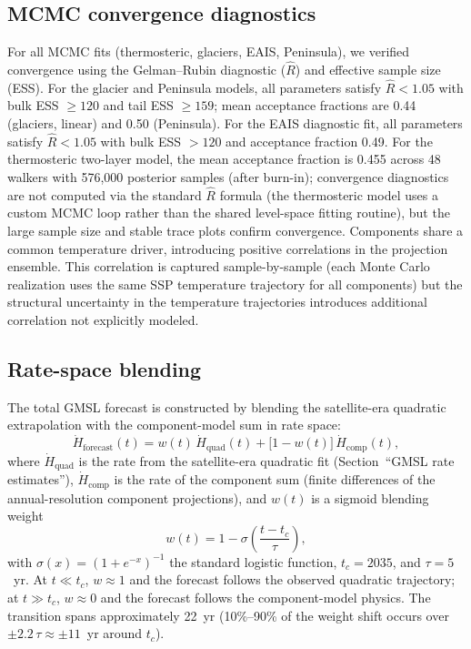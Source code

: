 \documentclass[12pt]{article}
\begin{document}
\subsection{MCMC convergence diagnostics}

For all MCMC fits (thermosteric, glaciers, EAIS, Peninsula), we verified convergence using the Gelman--Rubin diagnostic ($\hat{R}$) and effective sample size (ESS). For the glacier and Peninsula models, all parameters satisfy $\hat{R} < 1.05$ with bulk ESS $\geq 120$ and tail ESS $\geq 159$; mean acceptance fractions are 0.44 (glaciers, linear) and 0.50 (Peninsula). For the EAIS diagnostic fit, all parameters satisfy $\hat{R} < 1.05$ with bulk ESS $> 120$ and acceptance fraction 0.49. For the thermosteric two-layer model, the mean acceptance fraction is 0.455 across 48 walkers with 576,000 posterior samples (after burn-in); convergence diagnostics are not computed via the standard $\hat{R}$ formula (the thermosteric model uses a custom MCMC loop rather than the shared level-space fitting routine), but the large sample size and stable trace plots confirm convergence. Components share a common temperature driver, introducing positive correlations in the projection ensemble. This correlation is captured sample-by-sample (each Monte Carlo realization uses the same SSP temperature trajectory for all components) but the structural uncertainty in the temperature trajectories introduces additional correlation not explicitly modeled.

\subsection{Rate-space blending}

The total GMSL forecast is constructed by blending the satellite-era quadratic extrapolation with the component-model sum in rate space:
\begin{equation}
	\dot{H}_{\mathrm{forecast}}(t) = w(t)\,\dot{H}_{\mathrm{quad}}(t) + \bigl[1 - w(t)\bigr]\,\dot{H}_{\mathrm{comp}}(t),
	\label{eq:blend_rate}
\end{equation}
where $\dot{H}_{\mathrm{quad}}$ is the rate from the satellite-era quadratic fit (Section~``GMSL rate estimates''), $\dot{H}_{\mathrm{comp}}$ is the rate of the component sum (finite differences of the annual-resolution component projections), and $w(t)$ is a sigmoid blending weight
\begin{equation}
	w(t) = 1 - \sigma\!\left(\frac{t - t_c}{\tau}\right),
	\label{eq:sigmoid_weight}
\end{equation}
with $\sigma(x) = (1 + e^{-x})^{-1}$ the standard logistic function, $t_c = 2035$, and $\tau = 5$~yr. At $t \ll t_c$, $w \approx 1$ and the forecast follows the observed quadratic trajectory; at $t \gg t_c$, $w \approx 0$ and the forecast follows the component-model physics. The transition spans approximately 22~yr (10\%--90\% of the weight shift occurs over $\pm 2.2\,\tau \approx \pm 11$~yr around $t_c$).
\end{document}
